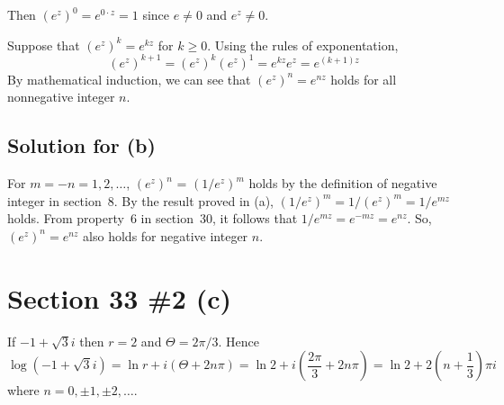 \documentclass{scrartcl}
\begin{document}
Then \((e^z)^0 = e^{0 \cdot z} = 1\) since \(e \not = 0\) and \(e^z \not = 0\).

Suppose that \((e^z)^k = e^{kz}\) for \(k \geq 0\). Using the rules of exponentation,
\[
  (e^z)^{k + 1} = (e^z)^k (e^z)^1 = e^{kz} e^z = e^{(k + 1)z}
\]
By mathematical induction, we can see that \((e^z)^n = e^{nz}\) holds for all nonnegative integer \(n\).

\subsection{Solution for (b)}
For \(m = -n = 1, 2, \dots\), \((e^z)^n\) = \((1 / e^z)^m\) holds by the definition of negative integer in section~8.
By the result proved in (a), \((1 / e^z)^m = 1 / (e^z)^m = 1/ e^{mz}\) holds.
From property~6 in section~30, it follows that \(1 / e^{mz} = e^{-mz} = e^{nz}\).
So, \((e^z)^n = e^{nz}\) also holds for negative integer \(n\).

\section{Section 33 \#2 (c)}
If \(-1 + \sqrt{3}i\) then \(r = 2\) and \(\Theta = 2\pi / 3\).
Hence
\[
  \log (-1 + \sqrt{3}i) = \ln r + i(\Theta + 2n\pi) = \ln 2 + i \left( \frac{2\pi}{3} + 2n\pi \right) = \ln 2 + 2 \left( n + \frac{1}{3} \right) \pi i
\]
where \(n = 0, \pm 1, \pm 2, \dots\).
\end{document}
